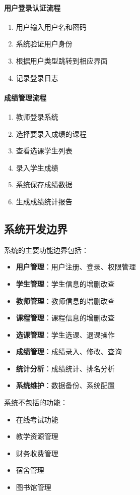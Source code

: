 \documentclass{zjut-report}
\begin{document}
\paragraph{用户登录认证流程}
\begin{enumerate}
\item 用户输入用户名和密码
\item 系统验证用户身份
\item 根据用户类型跳转到相应界面
\item 记录登录日志
\end{enumerate}

\paragraph{成绩管理流程}
\begin{enumerate}
\item 教师登录系统
\item 选择要录入成绩的课程
\item 查看选课学生列表
\item 录入学生成绩
\item 系统保存成绩数据
\item 生成成绩统计报告
\end{enumerate}

\subsection{系统开发边界}

系统的主要功能边界包括：

\begin{itemize}
\item \textbf{用户管理}：用户注册、登录、权限管理
\item \textbf{学生管理}：学生信息的增删改查
\item \textbf{教师管理}：教师信息的增删改查
\item \textbf{课程管理}：课程信息的增删改查
\item \textbf{选课管理}：学生选课、退课操作
\item \textbf{成绩管理}：成绩录入、修改、查询
\item \textbf{统计分析}：成绩统计、排名分析
\item \textbf{系统维护}：数据备份、系统配置
\end{itemize}

系统不包括的功能：
\begin{itemize}
\item 在线考试功能
\item 教学资源管理
\item 财务收费管理
\item 宿舍管理
\item 图书馆管理
\end{itemize}
\end{document}
